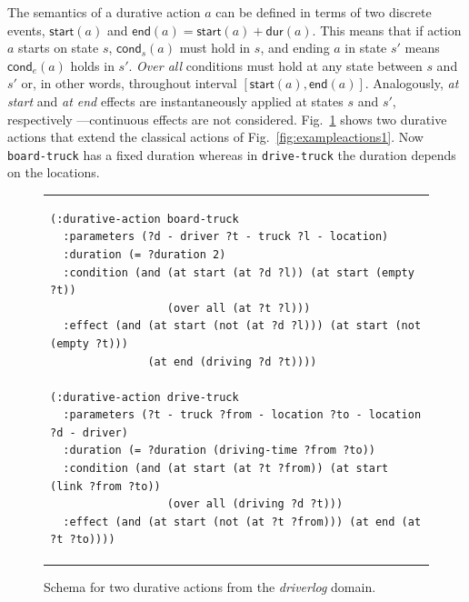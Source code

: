\documentclass[runningheads]{llncs}
\newcommand{\cond}{\mathsf{cond}}  %
\newcommand{\dur}{\mathsf{dur}}    %
\newcommand{\start}{\mathsf{start}}%
\newcommand{\en}{\mathsf{end}}     %
\newcommand{\til}{\mathsf{til}}    %
\begin{document}

The semantics of a durative action $a$ can be defined in terms of two discrete events, $\start(a)$ and $\en(a)=\start(a)+\dur(a)$. This means that if action $a$ starts on state $s$, $\cond_s(a)$ must hold in $s$, and ending $a$ in state $s'$ means $\cond_e(a)$ holds in $s'$. {\em Over all} conditions must hold at any state between $s$ and $s'$ or, in other words, throughout interval $[\start(a),\en(a)]$.
Analogously, {\em at start} and {\em at end} effects are instantaneously applied at states $s$ and $s'$, respectively ---continuous effects are not considered.
Fig.~\ref{fig:exampleactions2} shows two durative actions that extend the classical actions of Fig.~\ref{fig:exampleactions1}. Now \texttt{board-truck} has a fixed duration whereas in \texttt{drive-truck} the duration depends on the locations.

\begin{figure}
\begin{tabular}{p{\textwidth}}
\begin{verbatim}
(:durative-action board-truck
  :parameters (?d - driver ?t - truck ?l - location)
  :duration (= ?duration 2)
  :condition (and (at start (at ?d ?l)) (at start (empty ?t))
                  (over all (at ?t ?l)))
  :effect (and (at start (not (at ?d ?l))) (at start (not (empty ?t)))
               (at end (driving ?d ?t))))

(:durative-action drive-truck
  :parameters (?t - truck ?from - location ?to - location ?d - driver)
  :duration (= ?duration (driving-time ?from ?to))
  :condition (and (at start (at ?t ?from)) (at start (link ?from ?to))
                  (over all (driving ?d ?t)))
  :effect (and (at start (not (at ?t ?from))) (at end (at ?t ?to))))
\end{verbatim}
\end{tabular}
\caption{\small Schema for two durative actions from the {\em driverlog} domain.}
\label{fig:exampleactions2}
\end{figure}



\end{document}
